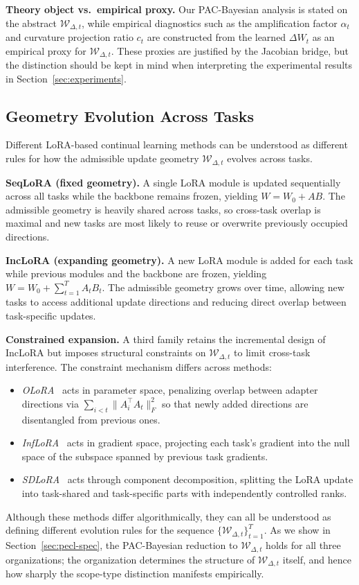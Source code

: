 \textbf{Theory object vs.\ empirical proxy.}
Our PAC-Bayesian analysis is stated on the abstract $\mathcal{W}_{\Delta,t}$, while empirical diagnostics such as the amplification factor $\alpha_t$ and curvature projection ratio $c_t$ are constructed from the learned $\Delta W_t$ as an empirical proxy for $\mathcal{W}_{\Delta,t}$.
These proxies are justified by the Jacobian bridge, but the distinction should be kept in mind when interpreting the experimental results in Section~\ref{sec:experiments}.

\subsection{Geometry Evolution Across Tasks}
\label{sec:lora-orgs}

Different LoRA-based continual learning methods can be understood as different rules for how the admissible update geometry $\mathcal{W}_{\Delta,t}$ evolves across tasks.

\textbf{SeqLoRA (fixed geometry).}
A single LoRA module is updated sequentially across all tasks while the backbone remains frozen, yielding $W = W_0 + AB$.
The admissible geometry is heavily shared across tasks, so cross-task overlap is maximal and new tasks are most likely to reuse or overwrite previously occupied directions.

\textbf{IncLoRA (expanding geometry).}
A new LoRA module is added for each task while previous modules and the backbone are frozen, yielding $W = W_0 + \sum_{t=1}^T A_t B_t$.
The admissible geometry grows over time, allowing new tasks to access additional update directions and reducing direct overlap between task-specific updates.

\textbf{Constrained expansion.}
A third family retains the incremental design of IncLoRA but imposes structural constraints on $\mathcal{W}_{\Delta,t}$ to limit cross-task interference.
The constraint mechanism differs across methods:
\begin{itemize}
  \item \emph{OLoRA}~\citep{wang2023orthogonal} acts in parameter space, penalizing overlap between adapter directions via $\sum_{i < t}\|A_i^\top A_t\|_F^2$ so that newly added directions are disentangled from previous ones.
  \item \emph{InfLoRA}~\citep{Liang_2024_CVPR} acts in gradient space, projecting each task's gradient into the null space of the subspace spanned by previous task gradients.
  \item \emph{SDLoRA}~\citep{wu2025sdlorascalabledecoupledlowrank} acts through component decomposition, splitting the LoRA update into task-shared and task-specific parts with independently controlled ranks.
\end{itemize}

Although these methods differ algorithmically, they can all be understood as defining different evolution rules for the sequence $\{\mathcal{W}_{\Delta,t}\}_{t=1}^T$.
As we show in Section~\ref{sec:pecl-spec}, the PAC-Bayesian reduction to $\mathcal{W}_{\Delta,t}$ holds for all three organizations; the organization determines the structure of $\mathcal{W}_{\Delta,t}$ itself, and hence how sharply the scope-type distinction manifests empirically.
